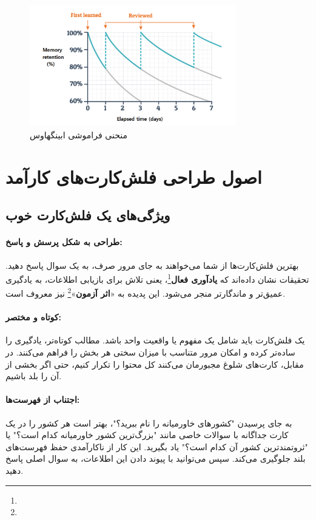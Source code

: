 \documentclass[12pt]{report}
\begin{document}
\begin{figure}[h!]
  \centering
  \includegraphics[width=0.8\textwidth]{images/forgetting-curve.png}
  \caption{منحنی فراموشی ابینگهاوس~\cite{flip}}
  \label{fig:forgetting-curve}
\end{figure}

\chapter{اصول طراحی فلش‌کارت‌های کارآمد}


\section{ویژگی‌های یک فلش‌کارت خوب}

    \subsubsection{طراحی به شکل پرسش و پاسخ:} بهترین فلش‌کارت‌ها از شما می‌خواهند به جای مرور صرف، به یک سوال پاسخ دهید. تحقیقات نشان داده‌اند که \textbf{یادآوری فعال}\footnote{}، یعنی تلاش برای بازیابی اطلاعات، به یادگیری عمیق‌تر و ماندگارتر منجر می‌شود. این پدیده به «\textbf{اثر آزمون}»\footnote{} نیز معروف است.

    \subsubsection{کوتاه و مختصر:} یک فلش‌کارت باید شامل یک مفهوم یا واقعیت واحد باشد. مطالب کوتاه‌تر، یادگیری را ساده‌تر کرده و امکان مرور متناسب با میزان سختی هر بخش را فراهم می‌کنند. در مقابل، کارت‌های شلوغ مجبورمان می‌کنند کل محتوا را تکرار کنیم، حتی اگر بخشی از آن را بلد باشیم.

    \subsubsection{اجتناب از فهرست‌ها:} به جای پرسیدن "کشورهای خاورمیانه را نام ببرید؟"، بهتر است هر کشور را در یک کارت جداگانه با سوالات خاصی مانند "بزرگ‌ترین کشور خاورمیانه کدام است؟" یا "ثروتمندترین کشور آن کدام است؟" یاد بگیرید. این کار از ناکارآمدی حفظ فهرست‌های بلند جلوگیری می‌کند. سپس می‌توانید با پیوند دادن این اطلاعات، به سوال اصلی پاسخ دهید.
    
\end{document}
